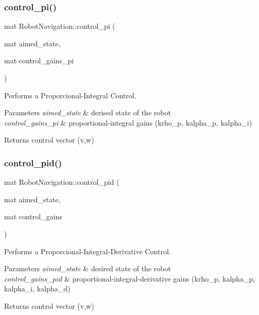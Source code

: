 \subsubsection{\texorpdfstring{control\+\_\+pi()}{control\_pi()}}
{\footnotesize\ttfamily mat Robot\+Navigation\+::control\+\_\+pi (\begin{DoxyParamCaption}\item[{mat}]{aimed\+\_\+state,  }\item[{mat}]{control\+\_\+gains\+\_\+pi }\end{DoxyParamCaption})}



Performs a Proporcional-\/\+Integral Control. 


\begin{DoxyParams}{Parameters}
{\em aimed\+\_\+state} & derised state of the robot \\
\hline
{\em control\+\_\+gains\+\_\+pi} & proportional-\/integral gains (krho\+\_\+p, kalpha\+\_\+p, kalpha\+\_\+i) \\
\hline
\end{DoxyParams}
\begin{DoxyReturn}{Returns}
control vector (v,w) 
\end{DoxyReturn}
\mbox{\label{class_robot_navigation_a5800adf6538584180ca33a2143934dfd}} 
\subsubsection{\texorpdfstring{control\+\_\+pid()}{control\_pid()}}
{\footnotesize\ttfamily mat Robot\+Navigation\+::control\+\_\+pid (\begin{DoxyParamCaption}\item[{mat}]{aimed\+\_\+state,  }\item[{mat}]{control\+\_\+gains }\end{DoxyParamCaption})}



Performs a Proporcional-\/\+Integral-\/\+Derivative Control. 


\begin{DoxyParams}{Parameters}
{\em aimed\+\_\+state} & desired state of the robot \\
\hline
{\em control\+\_\+gains\+\_\+pid} & proportional-\/integral-\/derivative gains (krho\+\_\+p, kalpha\+\_\+p, kalpha\+\_\+i, kalpha\+\_\+d) \\
\hline
\end{DoxyParams}
\begin{DoxyReturn}{Returns}
control vector (v,w) 
\end{DoxyReturn}
\mbox{\label{class_robot_navigation_a3ecd5c2f6f316b4b41b48cb0c28a944e}} 
